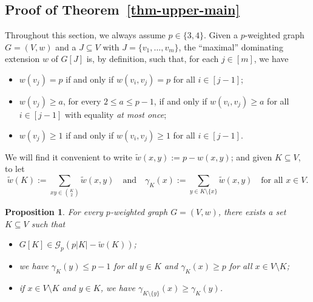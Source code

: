 \documentclass[11pt, a4paper]{article}
\newtheorem{proposition}[theorem]{Proposition}
\theoremstyle{definition}
\newcommand{\cG}{\mathcal{G}}
\begin{document}
\subsection{Proof of Theorem~\ref{thm-upper-main}}\label{sec-upper-main}
Throughout this section, we always assume $p\in\{3,4\}$. 
Given a $p$-weighted graph $G=(V,w)$ and a $J \subseteq V$ with $J = \{v_1,\ldots,v_m\}$,
the ``maximal'' dominating extension $w$ of $G[J]$ is, by definition, such that,
for each $j\in [m]$, we have
\begin{itemize}
	\item $w(v_j) = p$ if and only if $w(v_i,v_j) = p$ for all $i \in [j-1]$;
	\item $w(v_j) \geq a$, for every $2\le a\le p-1$, if and only if $w(v_i,v_j)\geq a$ for all $i \in [j-1]$ with equality \emph{at most once};
	\item $w(v_j)\geq 1$ if and only if $w(v_i,v_j) \geq 1$ for all $i \in [j-1]$.
\end{itemize}

We will find it convenient to write $\tilde{w}(x,y) := p - w(x,y)$; and given $K \subseteq V$, to let
$$
\tilde{w}(K) := \sum_{xy \in \binom{K}{2}}\tilde{w}(x,y)\quad\text{and}\quad \gamma_K(x) := \sum_{y \in K\setminus\{x\}}\tilde{w}(x,y)\quad\text{for all }x \in V.
$$

\begin{proposition}\label{prop-hero}
	For every $p$-weighted graph $G=(V,w)$, there exists a set $K \subseteq V$ such that
	\begin{itemize}
	\item[(i)] $G[K] \in \cG_p(p|K|-\tilde{w}(K))$;
	\item[(ii)] we have $\gamma_K(y) \leq p-1$ for all $y \in K$ and $\gamma_K(x) \geq p$ for all $x \in V\setminus K$;
	\item[(iii)] if $x \in V\setminus K$ and $y \in K$, we have $\gamma_{K\setminus\{y\}}(x) \geq \gamma_K(y)$.
	\end{itemize}
\end{proposition}
\end{document}
